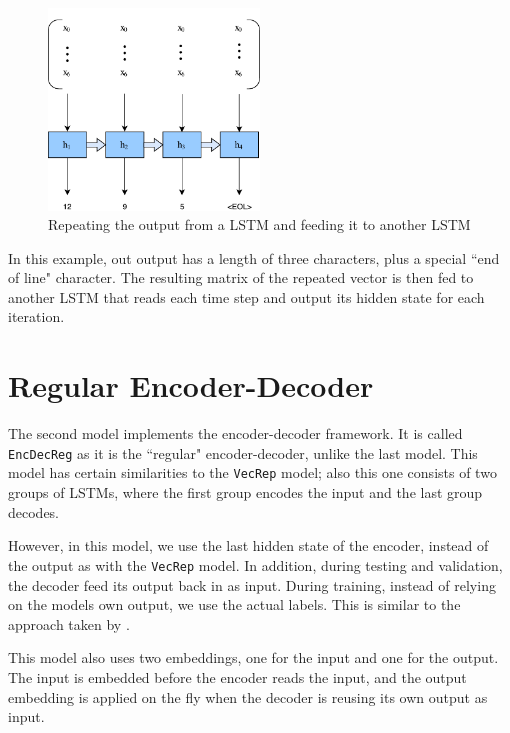 \begin{figure}[ht]
    \centering
    \includegraphics[width=0.5\textwidth]{fig/development_process/lstm-vector-projection-decoder.pdf}
    \caption{Repeating the output from a LSTM and feeding it to another LSTM}
    \label{fig:lstm-vector-projection-decoder}
\end{figure}

In this example, out output has a length of three characters, plus a special ``end of line" character. The resulting matrix of the repeated vector is then fed to another LSTM that reads each time step and output its hidden state for each iteration.


\section{Regular Encoder-Decoder}
The second model implements the encoder-decoder framework. It is called {\tt EncDecReg} as it is the ``regular" encoder-decoder, unlike the last model. This model has certain similarities to the {\tt VecRep} model; also this one consists of two groups of LSTMs, where the first group encodes the input and the last group decodes.

However, in this model, we use the last hidden state of the encoder, instead of the output as with the {\tt VecRep} model. In addition, during testing and validation, the decoder feed its output back in as input. During training, instead of relying on the models own output, we use the actual labels. This is similar to the approach taken by \citep{bengio2015scheduled}.

This model also uses two embeddings, one for the input and one for the output. The input is embedded before the encoder reads the input, and the output embedding is applied on the fly when the decoder is reusing its own output as input.

